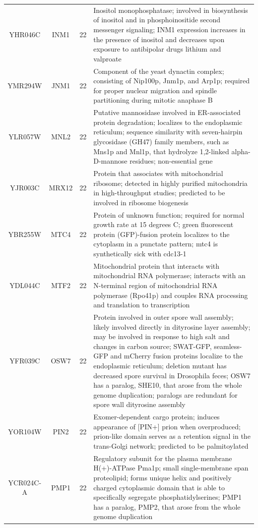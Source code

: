 \documentclass[]{article}
\begin{document}
\begin{longtable}{@{\extracolsep{3pt}} cccp{85mm}}
YHR046C & INM1 & 22 & Inositol monophosphatase; involved in biosynthesis of inositol and in phosphoinositide second messenger signaling; INM1 expression increases in the presence of inositol and decreases upon exposure to antibipolar drugs lithium and valproate \\ 
YMR294W & JNM1 & 22 & Component of the yeast dynactin complex; consisting of Nip100p, Jnm1p, and Arp1p; required for proper nuclear migration and spindle partitioning during mitotic anaphase B \\ 
YLR057W & MNL2 & 22 & Putative mannosidase involved in ER-associated protein degradation; localizes to the endoplasmic reticulum; sequence similarity with seven-hairpin glycosidase (GH47) family members, such as Mns1p and Mnl1p, that hydrolyze 1,2-linked alpha-D-mannose residues; non-essential gene \\ 
YJR003C & MRX12 & 22 & Protein that associates with mitochondrial ribosome; detected in highly purified mitochondria in high-throughput studies; predicted to be involved in ribosome biogenesis \\ 
YBR255W & MTC4 & 22 & Protein of unknown function; required for normal growth rate at 15 degrees C; green fluorescent protein (GFP)-fusion protein localizes to the cytoplasm in a punctate pattern; mtc4 is synthetically sick with cdc13-1 \\ 
YDL044C & MTF2 & 22 & Mitochondrial protein that interacts with mitochondrial RNA polymerase; interacts with an N-terminal region of mitochondrial RNA polymerase (Rpo41p) and couples RNA processing and translation to transcription \\ 
YFR039C & OSW7 & 22 & Protein involved in outer spore wall assembly; likely involved directly in dityrosine layer assembly; may be involved in response to high salt and changes in carbon source; SWAT-GFP, seamless-GFP and mCherry fusion proteins localize to the endoplasmic reticulum; deletion mutant has decreased spore survival in Drosophila feces; OSW7 has a paralog, SHE10, that arose from the whole genome duplication; paralogs are redundant for spore wall dityrosine assembly \\ 
YOR104W & PIN2 & 22 & Exomer-dependent cargo protein; induces appearance of [PIN+] prion when overproduced; prion-like domain serves as a retention signal in the trans-Golgi network; predicted to be palmitoylated \\ 
YCR024C-A & PMP1 & 22 & Regulatory subunit for the plasma membrane H(+)-ATPase Pma1p; small single-membrane span proteolipid; forms unique helix and positively charged cytoplasmic domain that is able to specifically segregate phosphatidylserines; PMP1 has a paralog, PMP2, that arose from the whole genome duplication \\ 

\end{longtable}
\end{document}
